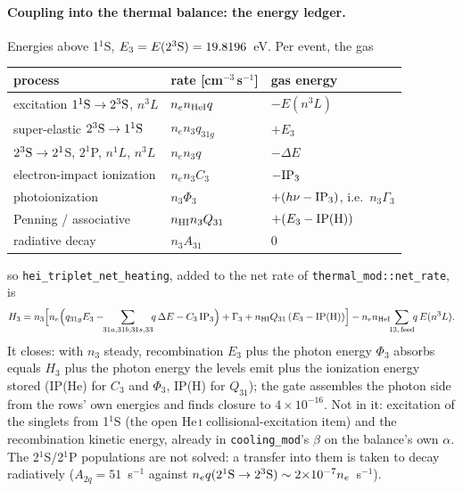 \documentclass[english,a4paper]{my_memo}
\newcommand{\code}[1]{\texttt{#1}}
\begin{document}
\paragraph{Coupling into the thermal balance: the energy ledger.}  Energies
above 1$^1$S, $E_3 = E(2^3{\rm S}) = 19.8196$~eV.  Per event, the gas
\begin{center}
\begin{tabular}{lll}
\toprule
process & rate [cm$^{-3}$\,s$^{-1}$] & gas energy \\
\midrule
excitation $1^1{\rm S}\rightarrow2^3{\rm S}$, $n^3L$ & $n_en_{\rm HeI}q$ &
  $-E(n^3L)$  \\
super-elastic $2^3{\rm S}\rightarrow1^1{\rm S}$ & $n_en_3q_{31g}$ & $+E_3$ \\
$2^3{\rm S}\rightarrow2^1$S, $2^1$P, $n^1L$, $n^3L$ & $n_en_3q$ & $-\Delta E$
   \\
electron-impact ionization & $n_en_3C_3$ & $-{\rm IP}_3$ \\
photoionization & $n_3\Phi_3$ & $+(h\nu - {\rm IP}_3)$, i.e.\ $n_3\Gamma_3$ \\
Penning / associative & $n_{\rm HI}n_3Q_{31}$ & $+(E_3 - {\rm IP(H)})$ \\
radiative decay & $n_3A_{31}$ & 0 \\
\bottomrule
\end{tabular}
\end{center}
so \code{hei\_triplet\_net\_heating}, added to the net rate of
\code{thermal\_mod::net\_rate}, is
\begin{equation}
H_3 = n_3\Big[n_e\Big(q_{31g}E_3 - \!\!\sum_{31a,31b,31s,33}\!\! q\,\Delta E
      - C_3\,{\rm IP}_3\Big) + \Gamma_3 + n_{\rm HI}Q_{31}\,(E_3-{\rm IP(H)})\Big]
      - n_en_{\rm HeI}\!\!\sum_{13,\,{\rm feed}}\!\! q\,E(n^3L).
\end{equation}
It closes: with $n_3$ steady, recombination $E_3$ plus the photon energy
$\Phi_3$ absorbs equals $H_3$ plus the photon energy the levels emit plus the
ionization energy stored (IP(He) for $C_3$ and $\Phi_3$, IP(H) for $Q_{31}$);
the gate assembles the photon side from the rows' own energies and finds
closure to $4{\times}10^{-16}$.  Not in it: excitation of the singlets from
1$^1$S (the open He\,\textsc{i} collisional-excitation item) and the
recombination kinetic energy, already in \code{cooling\_mod}'s
$\beta$ on the balance's own $\alpha$.  The 2$^1$S/2$^1$P populations are not
solved: a transfer into them is taken to decay radiatively ($A_{2q} =
51$~s$^{-1}$ against $n_e q(2^1{\rm S}\rightarrow2^3{\rm S})\sim
2{\times}10^{-7}n_e$~s$^{-1}$).
\end{document}
